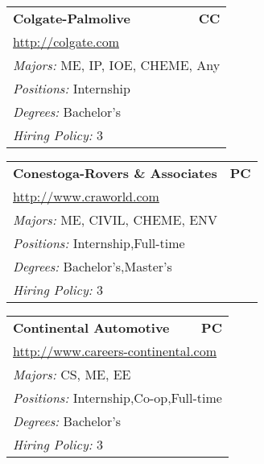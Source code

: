 \documentclass[twoside]{article}
\begin{document}
\begin{center}
\begin{multicols}{3}
\begin{FlushLeft}
\begin{minipage}{.9\columnwidth}
\end{minipage}
 
\begin{minipage}{.9\columnwidth}\begin{tabularx}{.95\columnwidth}{Xr}
                 {\Large\bf Colgate-Palmolive} & {\Large\bf CC}\\
    \multicolumn{2}{p{.95\columnwidth}}{\url{http://colgate.com}}\\
    \multicolumn{2}{p{.95\columnwidth}}{\emph{Majors:} ME, IP, IOE, CHEME, Any}\\
    \multicolumn{2}{p{.95\columnwidth}}{\emph{Positions:} Internship}\\
    \multicolumn{2}{p{.95\columnwidth}}{\emph{Degrees:} Bachelor's}\\
    \multicolumn{2}{p{.95\columnwidth}}{\emph{Hiring Policy:} 3}\\
    \end{tabularx}
    
\end{minipage}
 
\begin{minipage}{.9\columnwidth}\begin{tabularx}{.95\columnwidth}{Xr}
                 {\Large\bf Conestoga-Rovers \& Associates} & {\Large\bf PC}\\
    \multicolumn{2}{p{.95\columnwidth}}{\url{http://www.craworld.com}}\\
    \multicolumn{2}{p{.95\columnwidth}}{\emph{Majors:} ME, CIVIL, CHEME, ENV}\\
    \multicolumn{2}{p{.95\columnwidth}}{\emph{Positions:} Internship,Full-time}\\
    \multicolumn{2}{p{.95\columnwidth}}{\emph{Degrees:} Bachelor's,Master's}\\
    \multicolumn{2}{p{.95\columnwidth}}{\emph{Hiring Policy:} 3}\\
    \end{tabularx}
    
\end{minipage}
 
\begin{minipage}{.9\columnwidth}\begin{tabularx}{.95\columnwidth}{Xr}
                 {\Large\bf Continental Automotive} & {\Large\bf PC}\\
    \multicolumn{2}{p{.95\columnwidth}}{\url{http://www.careers-continental.com}}\\
    \multicolumn{2}{p{.95\columnwidth}}{\emph{Majors:} CS, ME, EE}\\
    \multicolumn{2}{p{.95\columnwidth}}{\emph{Positions:} Internship,Co-op,Full-time}\\
    \multicolumn{2}{p{.95\columnwidth}}{\emph{Degrees:} Bachelor's}\\
    \multicolumn{2}{p{.95\columnwidth}}{\emph{Hiring Policy:} 3}\\
    \end{tabularx}
    

\end{minipage}
\end{FlushLeft}
\end{multicols}
\end{center}
\end{document}
